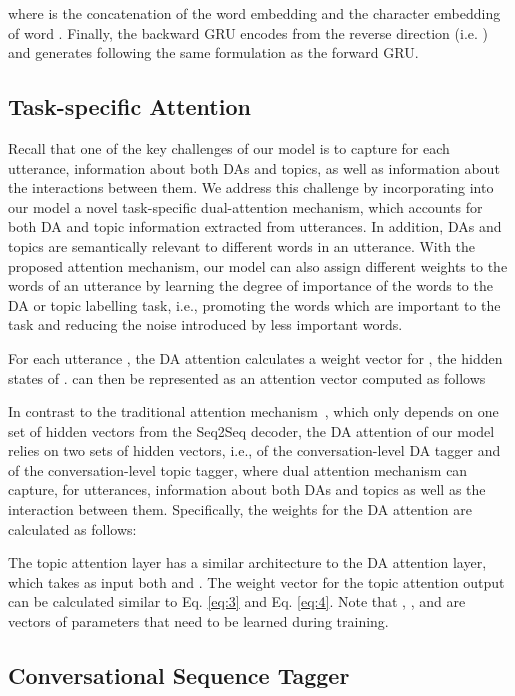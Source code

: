 \documentclass[11pt,a4paper]{article}
\begin{document}
where  is the concatenation of the word embedding and the character embedding of word . Finally, the backward GRU encodes \textbf{} from the reverse direction (i.e. ) and generates  following the same formulation as the forward GRU.


\subsection{Task-specific Attention} 

Recall that one of the key challenges of our model is to capture for each utterance, information about both DAs and topics, as well as information about the interactions between them. We address this challenge by incorporating into our model a novel task-specific dual-attention mechanism, which accounts for both DA and topic information extracted from utterances.   
In addition, DAs and topics are semantically relevant to  different words in an utterance. With the proposed attention mechanism, our model can also assign different weights to the words of an utterance by learning the degree of importance of the words to the DA or topic labelling task, i.e., promoting the words which are important to the task and reducing the noise introduced by less important words.

For each utterance , the DA attention calculates a weight vector  for , the hidden states of .  can then be represented as an attention vector  computed as follows 


In contrast to the traditional attention mechanism~\cite{bahdanau2014neural}, which only depends on one set of hidden vectors from the Seq2Seq decoder, the DA attention of our model relies on two sets of hidden vectors, i.e.,  of the conversation-level DA tagger and  of the conversation-level topic tagger, where dual attention mechanism can capture, for utterances, information about both DAs and topics as well as the interaction between them. Specifically, the weights  for the DA attention are calculated as follows: 
\def\softmax{\mathop{\rm softmax}}
 

The topic attention layer has a similar architecture to the DA attention layer, which takes as input both  and . 
The weight vector  for the  topic attention output  can be calculated similar to Eq. \ref{eq:3} and Eq. \ref{eq:4}.
Note that , 
, 
and 
are vectors of parameters that  need to be learned during training. 

\subsection{Conversational Sequence Tagger}
\end{document}
